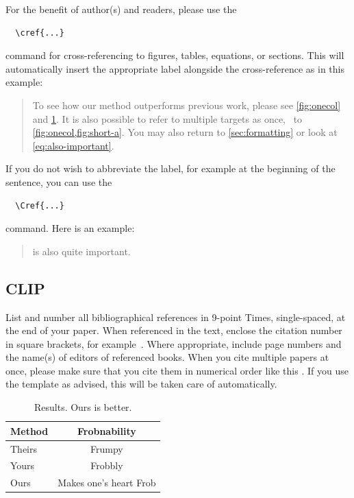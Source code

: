 For the benefit of author(s) and readers, please use the
{\small\begin{verbatim}
  \cref{...}
\end{verbatim}}  command for cross-referencing to figures, tables, equations, or sections.
This will automatically insert the appropriate label alongside the cross-reference as in this example:
\begin{quotation}
  To see how our method outperforms previous work, please see \cref{fig:onecol} and \cref{tab:example}.
  It is also possible to refer to multiple targets as once, \eg~to \cref{fig:onecol,fig:short-a}.
  You may also return to \cref{sec:formatting} or look at \cref{eq:also-important}.
\end{quotation}
If you do not wish to abbreviate the label, for example at the beginning of the sentence, you can use the
{\small\begin{verbatim}
  \Cref{...}
\end{verbatim}}
command. Here is an example:
\begin{quotation}
   is also quite important.
\end{quotation}

\subsection{CLIP}

List and number all bibliographical references in 9-point Times, single-spaced, at the end of your paper.
When referenced in the text, enclose the citation number in square brackets, for
example~\cite{Authors14}.
Where appropriate, include page numbers and the name(s) of editors of referenced books.
When you cite multiple papers at once, please make sure that you cite them in numerical order like this \cite{Alpher02,Alpher03,Alpher05,Authors14b,Authors14}.
If you use the template as advised, this will be taken care of automatically.

\begin{table}
  \centering
  \begin{tabular}{@{}lc@{}}
    \toprule
    Method & Frobnability \\
    \midrule
    Theirs & Frumpy \\
    Yours & Frobbly \\
    Ours & Makes one's heart Frob\\
    \bottomrule
  \end{tabular}
  \caption{Results.   Ours is better.}
  \label{tab:example}
\end{table}

